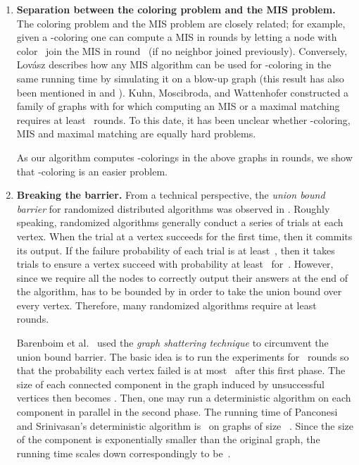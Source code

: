 \documentclass[11pt]{amsart}
\begin{document}
\begin{enumerate}
\item {\bf Separation between the coloring problem and the MIS problem.}  The coloring problem and the MIS problem are closely related; for example, given a -coloring one can compute a MIS in  rounds by letting a node with color~ join the MIS in round~ (if no neighbor joined previously). Conversely, Lov\'{a}sz describes how any MIS algorithm can be used for -coloring in the same running time by simulating it on a blow-up graph \cite{lov79} (this result has also been mentioned in \cite{lub86} and \cite{alon86}). Kuhn, Moscibroda, and Wattenhofer \cite{kuh10} constructed a family of graphs with  for which computing an MIS or a maximal matching requires at least~ rounds. To this date, it has been unclear whether -coloring,  MIS and maximal matching are equally hard problems.

As our algorithm computes -colorings in the above graphs in  rounds, we show that -coloring is an easier problem.

\item {\bf Breaking the  barrier.} From a technical perspective, the {\it union bound barrier} for randomized distributed algorithms was observed in \cite{bar15}. Roughly speaking, randomized algorithms generally conduct a series of trials at each vertex. When the trial at a vertex succeeds for the first time, then it commits its output. If the failure probability of each trial is at least~, then it takes  trials to ensure a vertex succeed with probability at least~ for~.  However, since we require all the nodes to correctly output their answers at the end of the algorithm,  has to be bounded by  in order to take the union bound over every vertex. Therefore, many randomized algorithms require at least~ rounds. 
	
Barenboim et al.~\cite{bar15a} used the {\it graph shattering technique} to circumvent the union bound barrier. The basic idea is to run the experiments for~ rounds so that the probability each vertex failed is at most~ after this first phase. The size of each connected component in the graph induced by unsuccessful vertices then becomes . Then, one may run a deterministic algorithm on each component in parallel in the second phase. The running time of Panconesi and Srinivasan's deterministic algorithm is~ on graphs of size ~\cite{panc92}. Since the size of the component is exponentially smaller than the original graph, the running time scales down correspondingly to be~. 
	

\end{enumerate}
\end{document}
